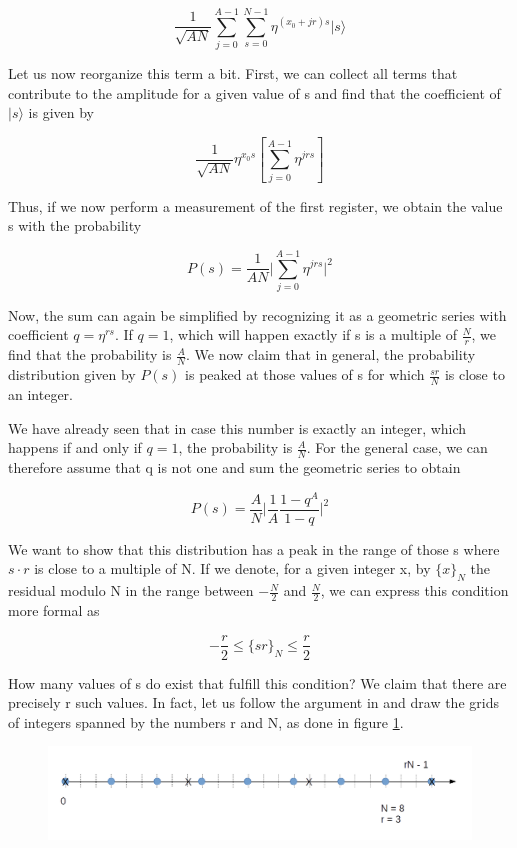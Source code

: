 \documentclass[a4paper, draft]{article}
\theoremstyle{own}
\theoremstyle{remark}
\begin{document}
$$
\frac{1}{\sqrt{AN}} \sum_{j=0}^{A-1} \sum_{s=0}^{N-1} \eta^{(x_0 + jr)s} |s \rangle 
$$

Let us now reorganize this term a bit. First, we can collect all terms that contribute to the amplitude for a given value of s and find that the coefficient of $|s \rangle $ is given by

$$
\frac{1}{\sqrt{AN}} \eta^{x_0 s} \left[ \sum_{j=0}^{A-1}  \eta^{jrs} \right] 
$$

Thus, if we now perform a measurement of the first register, we obtain the value s with the probability

$$
P(s) = \frac{1}{AN} \big| \sum_{j=0}^{A-1}  \eta^{jrs} \big|^2
$$

Now, the sum can again be simplified by recognizing it as a geometric series with coefficient $q = \eta^{rs}$. If $q = 1$, which will happen exactly if s is a multiple of $\frac{N}{r}$, we find that the probability is $\frac{A}{N}$. We now claim that in general, the probability distribution given by $P(s)$ is peaked at those values of s for which $\frac{sr}{N}$ is close to an integer.

We have already seen that in case this number is exactly an integer, which happens if and only if $q = 1$, the probability is $\frac{A}{N}$. For the general case, we can therefore assume that q is not one and sum the geometric series to obtain

$$
P(s) = \frac{A}{N} \big| \frac{1}{A} \frac{1 - q^A}{1 - q} \big|^2
$$

We want to show that this distribution has a peak in the range of those s where $s\cdot r$ is close to a multiple of N. If we denote, for a given integer x, by $\{x\}_N$ the residual modulo N in the range between $-\frac{N}{2}$ and $\frac{N}{2}$, we can express this condition more formal as

$$
-\frac{r}{2} \leq \{sr \}_N \leq \frac{r}{2}
$$
 
 
How many values of s do exist that fulfill this condition?  We claim that there are precisely r such values. In fact, let us follow the argument in \cite{P} and draw the grids of integers spanned by the numbers r and N, as done in figure \ref{fig:ShorGrids}.

\begin{figure}[ht]
\centering
\includegraphics[width=1.0\linewidth]{images/ShorGrids}
\caption[The grid spanned by N and r]{}
\label{fig:ShorGrids}
\end{figure}
\end{document}
